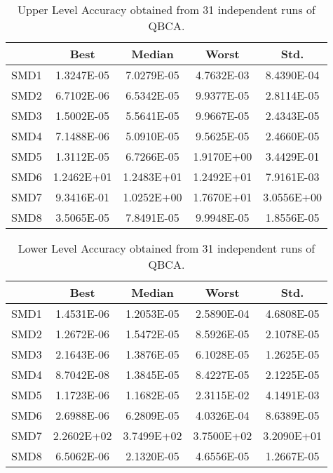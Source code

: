 \documentclass[conference]{IEEEtran}
\theoremstyle{definition}
\begin{document}
\begin{table}[!ht]
    \caption{Upper Level Accuracy obtained from 31 independent runs of QBCA.}
    \label{tab:ul-accur}
    \centering
    \begin{tabular}{ccccc}
        \hline
        & Best &  Median  &  Worst &  Std. \\ \hline
        SMD1 & 1.3247E-05 & 7.0279E-05 %
        & 4.7632E-03 & 8.4390E-04 \\ \hline 
        SMD2 & 6.7102E-06 & 6.5342E-05 %
        & 9.9377E-05 & 2.8114E-05 \\ \hline 
        SMD3 & 1.5002E-05 & 5.5641E-05 %
        & 9.9667E-05 & 2.4343E-05 \\ \hline 
        SMD4 & 7.1488E-06 & 5.0910E-05 %
        & 9.5625E-05 & 2.4660E-05 \\ \hline 
        SMD5 & 1.3112E-05 & 6.7266E-05 %
        & 1.9170E+00 & 3.4429E-01 \\ \hline 
        SMD6 & 1.2462E+01 & 1.2483E+01 %
        & 1.2492E+01 & 7.9161E-03 \\ \hline 
        SMD7 & 9.3416E-01 & 1.0252E+00 %
        & 1.7670E+01 & 3.0556E+00 \\ \hline 
        SMD8 & 3.5065E-05 & 7.8491E-05 %
        & 9.9948E-05 & 1.8556E-05 \\ \hline 
 
    \end{tabular}
\end{table}
% 
\begin{table}[!ht]
    \caption{Lower Level Accuracy obtained from 31 independent runs of QBCA.}
    \label{tab:ll-accur}
    \centering
    \begin{tabular}{ccccc}
        \hline
        & Best &  Median  &  Worst &  Std. \\ \hline

        SMD1 & 1.4531E-06 & 1.2053E-05 %
        & 2.5890E-04 & 4.6808E-05 \\ \hline 
        SMD2 & 1.2672E-06 & 1.5472E-05 %
        & 8.5926E-05 & 2.1078E-05 \\ \hline 
        SMD3 & 2.1643E-06 & 1.3876E-05 %
        & 6.1028E-05 & 1.2625E-05 \\ \hline 
        SMD4 & 8.7042E-08 & 1.3845E-05 %
        & 8.4227E-05 & 2.1225E-05 \\ \hline 
        SMD5 & 1.1723E-06 & 1.1682E-05 %
        & 2.3115E-02 & 4.1491E-03 \\ \hline 
        SMD6 & 2.6988E-06 & 6.2809E-05 %
        & 4.0326E-04 & 8.6389E-05 \\ \hline 
        SMD7 & 2.2602E+02 & 3.7499E+02 %
        & 3.7500E+02 & 3.2090E+01 \\ \hline 
        SMD8 & 6.5062E-06 & 2.1320E-05 %
        & 4.6556E-05 & 1.2667E-05 \\ \hline 

    \end{tabular}
\end{table}
\end{document}
